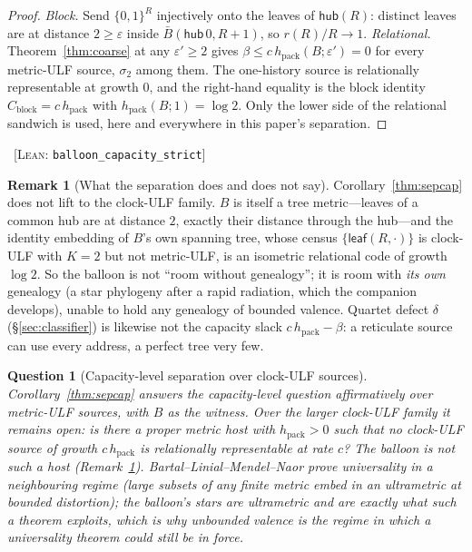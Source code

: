 \documentclass[11pt,reqno]{amsart}
\theoremstyle{plain}
\newtheorem{question}[theorem]{Question}
\theoremstyle{definition}
\newtheorem{remark}[theorem]{Remark}
\newcommand{\hpack}{h_{\mathrm{pack}}}
\newcommand{\Cblock}{C_{\mathrm{block}}}
\newcommand{\eps}{\varepsilon}
\newcommand{\cert}[1]{{\footnotesize\ [\textsc{Lean}: \texttt{#1}]}}
\begin{document}
\begin{proof}
\emph{Block.} Send $\{0,1\}^R$ injectively onto the leaves of $\mathsf{hub}(R)$: distinct leaves are at distance $2\ge\eps$ inside $\bar B(\mathsf{hub}\,0,R+1)$, so $r(R)/R\to1$. \emph{Relational.} Theorem~\ref{thm:coarse} at any $\eps'\ge2$ gives $\beta\le c\,\hpack(B;\eps')=0$ for every metric-ULF source, $\sigma_2$ among them. The one-history source is relationally representable at growth $0$, and the right-hand equality is the block identity $\Cblock=c\,\hpack$ with $\hpack(B;1)=\log2$. Only the lower side of the relational sandwich is used, here and everywhere in this paper's separation.
\end{proof}\cert{balloon\_capacity\_strict}

\begin{remark}[What the separation does and does not say]\label{rem:balloon}
Corollary~\ref{thm:sepcap} does not lift to the clock-ULF family. $B$ is itself a tree metric---leaves of a common hub are at distance $2$, exactly their distance through the hub---and the identity embedding of $B$'s own spanning tree, whose census $\{\mathsf{leaf}(R,\cdot)\}$ is clock-ULF with $K=2$ but not metric-ULF, is an isometric relational code of growth $\log2$. So the balloon is not ``room without genealogy''; it is room with \emph{its own} genealogy (a star phylogeny after a rapid radiation, which the companion develops), unable to hold any genealogy of bounded valence. Quartet defect $\delta$ (\S\ref{sec:classifier}) is likewise not the capacity slack $c\,\hpack-\beta$: a reticulate source can use every address, a perfect tree very few.
\end{remark}


\begin{question}[Capacity-level separation over clock-ULF sources]\label{q:sep}
Corollary~\ref{thm:sepcap} answers the capacity-level question affirmatively over metric-ULF sources, with $B$ as the witness. Over the larger clock-ULF family it remains open: is there a proper metric host with $\hpack>0$ such that \emph{no} clock-ULF source of growth $c\,\hpack$ is relationally representable at rate $c$? The balloon is not such a host (Remark~\ref{rem:balloon}). Bartal--Linial--Mendel--Naor \cite{blmn2005} prove universality in a neighbouring regime (large subsets of any finite metric embed in an ultrametric at bounded distortion); the balloon's stars are ultrametric and are exactly what such a theorem exploits, which is why unbounded valence is the regime in which a universality theorem could still be in force.
\end{question}
\end{document}
